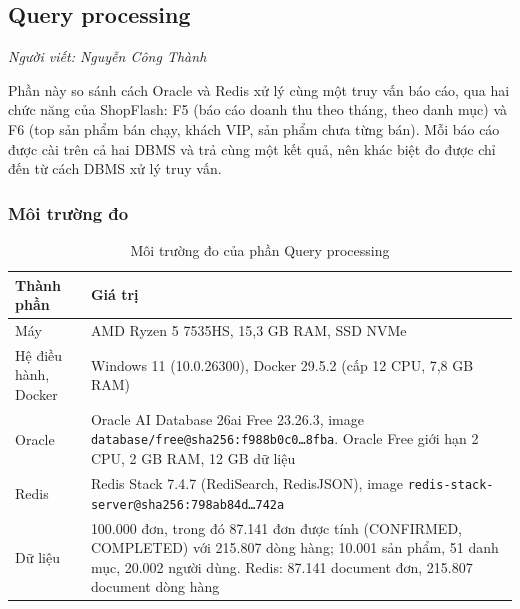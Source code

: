 
\subsection{Query processing}\label{sec:q}

\noindent\textit{Người viết: Nguyễn Công Thành}

Phần này so sánh cách Oracle và Redis xử lý cùng một truy vấn báo cáo, qua hai chức năng của ShopFlash: F5 (báo cáo doanh thu theo tháng, theo danh mục) và F6 (top sản phẩm bán chạy, khách VIP, sản phẩm chưa từng bán). Mỗi báo cáo được cài trên cả hai DBMS và trả cùng một kết quả, nên khác biệt đo được chỉ đến từ cách DBMS xử lý truy vấn.

\subsubsection*{Môi trường đo}

\begin{table}[H]
\centering
\caption{Môi trường đo của phần Query processing}\label{tab:q-env}
\small
\begin{tabularx}{\linewidth}{@{}lX@{}}
\toprule
Thành phần & Giá trị \\
\midrule
Máy & AMD Ryzen 5 7535HS, 15,3 GB RAM, SSD NVMe \\
Hệ điều hành, Docker & Windows 11 (10.0.26300), Docker 29.5.2 (cấp 12 CPU, 7,8 GB RAM) \\
Oracle & Oracle AI Database 26ai Free 23.26.3, image \texttt{database/free@sha256:f988b0c0\ldots8fba}. Oracle Free giới hạn 2 CPU, 2 GB RAM, 12 GB dữ liệu \\
Redis & Redis Stack 7.4.7 (RediSearch, RedisJSON), image \texttt{redis-stack-server@sha256:798ab84d\ldots742a} \\
Dữ liệu & 100.000 đơn, trong đó 87.141 đơn được tính (CONFIRMED, COMPLETED) với 215.807 dòng hàng; 10.001 sản phẩm, 51 danh mục, 20.002 người dùng. Redis: 87.141 document đơn, 215.807 document dòng hàng \\
\bottomrule
\end{tabularx}
\end{table}

